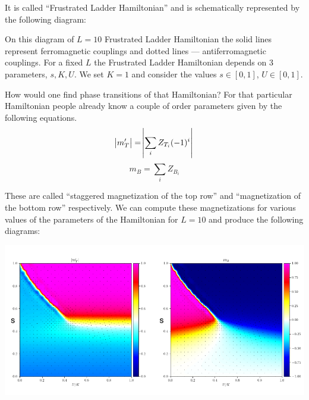 \documentclass[american,aps,pra,reprint,floatfix,nofootinbib,superscriptaddress]{revtex4-2}
\newcommand{\absmt}{\abs{m_{T}'}}
\begin{document}
It is called ``Frustrated Ladder Hamiltonian'' and is schematically represented
by the following diagram:
\begin{center}
  \pgfmathparse{\columnwidth/10.7cm}%
  \edef\tikzscale{\pgfmathresult}%
\end{center}
On this diagram of $L=10$ Frustrated Ladder Hamiltonian
the solid lines represent ferromagnetic couplings and
dotted lines --- antiferromagnetic couplings. For a fixed $L$
the Frustrated Ladder Hamiltonian depends on 3 parameters, $s, K, U$.
We set $K=1$ and consider the values $s\in[0,1]$, $U\in[0,1]$.

How would one find phase transitions of that Hamiltonian? For that particular
Hamiltonian people already know a couple of order parameters given by the
following equations.
\begin{equation}
  \label{eq:mt}
  \absmt = \abs{\sum_i Z_{T_i}(-1)^i}
\end{equation}
\begin{equation}
  \label{eq:mb}
  m_B = \sum_i Z_{B_i}
\end{equation}

These are called ``staggered magnetization of the top row'' and ``magnetization
of the bottom row'' respectively. We can compute these magnetizations for various
values of the parameters of the Hamiltonian for $L=10$ and produce the
following diagrams:

\includegraphics[width=\dimexpr\columnwidth-10.0pt]{lanczos_chi0_gp.png}
\end{document}
